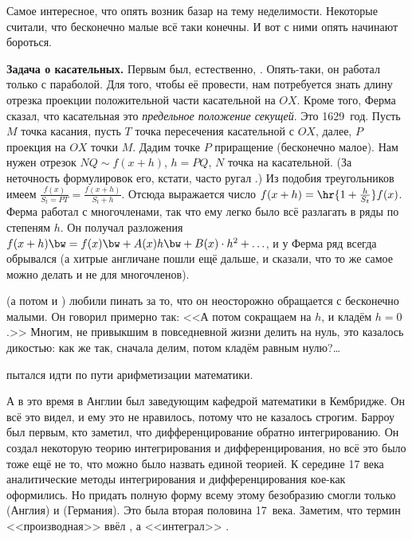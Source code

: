 \documentclass[a4paper,oneside,fleqn,10pt]{article}
\begin{document}
Самое интересное, что опять возник базар на тему неделимости.
Некоторые считали, что бесконечно малые всё таки конечны.
И вот с ними опять начинают бороться.

\textbf{Задача о касательных.} Первым был, естественно, .
Опять-таки, он работал только с параболой. Для того, чтобы её провести,
нам потребуется знать длину отрезка проекции положительной части касательной на $OX$.
Кроме того, Ферма сказал, что касательная это \emph{предельное положение секущей}.
Это 1629~год.
Пусть $M$ точка касания, пусть $T$ точка пересечения касательной с $OX$,
далее, $P$ проекция на $OX$ точки $M$. Дадим точке $P$ приращение (бесконечно малое).
Нам нужен отрезок $NQ \sim f(x +h)$, $h = PQ$, $N$ точка на касательной.
(За неточность формулировок его, кстати, часто ругал .)
Из подобия треугольников имеем $\frac{f(x)}{S_t = PT} = \frac{f(x+h)}{S_t + h}$.
Отсюда выражается число $f(x+h) = \hr{1 + \frac{h}{S_t}}f(x)$.
Ферма работал с многочленами, так что ему легко было всё разлагать в ряды
по степеням $h$.
Он получал разложения $f(x+h) \bw= f(x) \bw+ A(x) h \bw+ B(x)\cdot h^2 +\ldots$, и у Ферма ряд всегда
обрывался (а хитрые англичане пошли ещё дальше, и сказали, что то же самое можно делать и не для многочленов).

 (а потом и ) любили пинать за то, что он неосторожно обращается с бесконечно малыми.
Он говорил примерно так: <<А потом сокращаем на $h$, и кладём $h = 0$.>> Многим, не привыкшим в повседневной
жизни делить на нуль, это казалось дикостью: как же
так, сначала делим, потом кладём равным нулю?\ldots

 пытался идти по пути арифметизации математики.

А в это время в Англии  был заведующим кафедрой математики
в Кембридже. Он всё это видел, и ему это не нравилось, потому что не казалось строгим.
Барроу был первым, кто заметил, что дифференцирование обратно интегрированию.
Он создал некоторую теорию интегрирования и дифференцирования, но всё это было тоже
ещё не то, что можно было назвать единой теорией.
К середине 17 века аналитические методы интегрирования и дифференцирования кое-как оформились.
Но придать полную форму всему этому безобразию смогли только  (Англия) и
 (Германия). Это была вторая половина 17~века.
Заметим, что термин <<производная>> ввёл , а <<интеграл>> .
\end{document}
